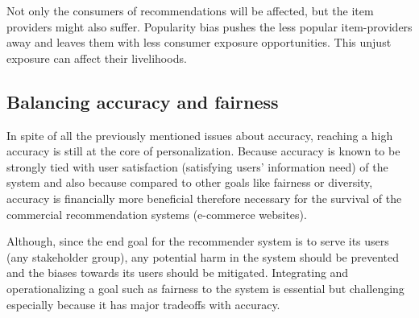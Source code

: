 Not only the consumers of recommendations will be affected, but the item providers might also suffer. Popularity bias pushes the less popular item-providers away and leaves them with less consumer exposure opportunities. This unjust exposure can affect their livelihoods.


\subsection{Balancing accuracy and fairness}

In spite of all the previously mentioned issues about accuracy, reaching a high accuracy is still at the core of personalization. Because accuracy is known to be strongly tied with user satisfaction (satisfying users' information need) of the system and also because compared to other goals like fairness or diversity, accuracy is financially more beneficial therefore necessary for the survival of the commercial recommendation systems (e-commerce websites).

Although, since the end goal for the recommender system is to serve its users (any stakeholder group), any potential harm in the system should be prevented and the biases towards its users should be mitigated. Integrating and operationalizing a goal such as fairness to the system is essential but challenging especially because it has major tradeoffs with accuracy.




